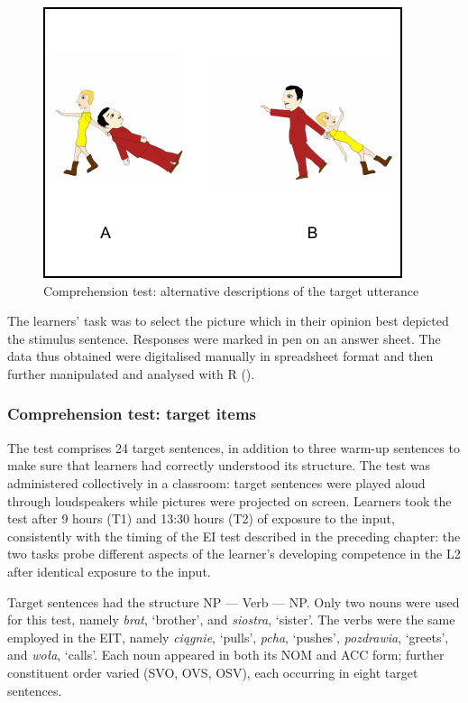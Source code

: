 \begin{figure}[b]
    \includegraphics[width=\textwidth]{figures/02-7.pdf}
    \caption{Comprehension test: alternative descriptions of the target utterance}
    \label{fig:02:7}
\end{figure} 

The learners' task was to select the picture which in their opinion best depicted the stimulus sentence. Responses were marked in pen on an answer sheet. The data thus obtained were digitalised manually in spreadsheet format and then further manipulated and analysed with R (\citealt{RCoreTeam2017}).

\subsubsection{Comprehension test: target items}

The test comprises 24 target sentences, in addition to three warm-up sentences to make sure that learners had correctly understood its structure. The test was administered collectively in a classroom: target sentences were played aloud through loudspeakers while pictures were projected on screen. Learners took the test after 9 hours (T1) and 13:30 hours (T2) of exposure to the input, consistently with the timing of the EI test described in the preceding chapter: the two tasks probe different aspects of the learner's developing competence in the L2 after identical exposure to the input.

Target sentences had the structure NP — Verb — NP. Only two nouns were used for this test, namely \textit{brat}, ‘brother’, and \textit{siostra}, ‘sister’. The verbs were the same employed in the EIT, namely \textit{ciągnie}, ‘pulls’,  \textit{pcha}, ‘pushes’, \textit{pozdrawia}, ‘greets’, and \textit{woła}, ‘calls’. Each noun appeared in both its NOM and ACC form; further constituent order varied (SVO, OVS, OSV), each occurring in eight target sentences. 

